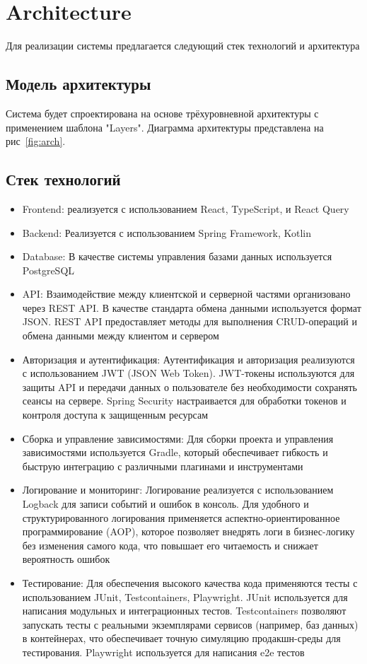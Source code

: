 \section{Architecture}
Для реализации системы предлагается следующий стек технологий и архитектура

\subsection{Модель архитектуры}
Система будет спроектирована на основе трёхуровневной архитектуры с применением шаблона "Layers".
Диаграмма архитектуры представлена на рис~\ref{fig:arch}.
\subsection{Стек технологий}
\begin{itemize}
	\item Frontend: реализуется с использованием React, TypeScript, и React Query
	\item Backend: Реализуется с использованием Spring Framework, Kotlin
	\item Database: В качестве системы управления базами данных используется PostgreSQL
	\item API: Взаимодействие между клиентской и серверной частями организовано через REST API. В качестве стандарта обмена данными используется формат JSON. REST API предоставляет методы для выполнения CRUD-операций и обмена данными между клиентом и сервером
	\item Авторизация и аутентификация: Аутентификация и авторизация реализуются с использованием JWT (JSON Web Token). JWT-токены используются для защиты API и передачи данных о пользователе без необходимости сохранять сеансы на сервере. Spring Security настраивается для обработки токенов и контроля доступа к защищенным ресурсам
	\item Сборка и управление зависимостями: Для сборки проекта и управления зависимостями используется Gradle, который обеспечивает гибкость и быструю интеграцию с различными плагинами и инструментами
	\item Логирование и мониторинг: Логирование реализуется с использованием Logback для записи событий и ошибок в консоль. Для удобного и структурированного логирования применяется аспектно-ориентированное программирование (AOP), которое позволяет внедрять логи в бизнес-логику без изменения самого кода, что повышает его читаемость и снижает вероятность ошибок
	\item Тестирование: Для обеспечения высокого качества кода применяются тесты с использованием JUnit, Testcontainers, Playwright. JUnit используется для написания модульных и интеграционных тестов. Testcontainers позволяют запускать тесты с реальными экземплярами сервисов (например, баз данных) в контейнерах, что обеспечивает точную симуляцию продакшн-среды для тестирования. Playwright используется для написания e2e тестов
\end{itemize}

